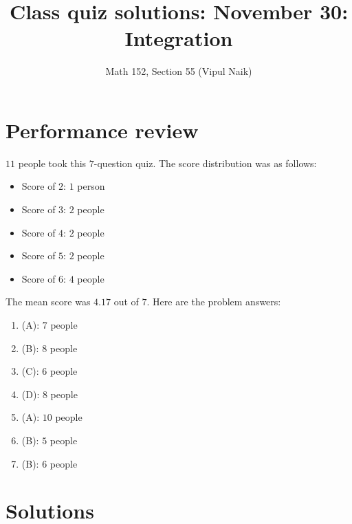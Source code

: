 \documentclass[10pt]{amsart}
\title{Class quiz solutions: November 30: Integration}
\author{Math 152, Section 55 (Vipul Naik)}
\begin{document}
\maketitle

\section{Performance review}

$11$ people took this $7$-question quiz. The score distribution was as follows:

\begin{itemize}
\item Score of $2$: $1$ person
\item Score of $3$: $2$ people
\item Score of $4$: $2$ people
\item Score of $5$: $2$ people
\item Score of $6$: $4$ people
\end{itemize}

The mean score was $4.17$ out of $7$. Here are the problem answers:

\begin{enumerate}
\item (A): $7$ people
\item (B): $8$ people
\item (C): $6$ people
\item (D): $8$ people
\item (A): $10$ people
\item (B): $5$ people
\item (B): $6$ people
\end{enumerate}

\section{Solutions}
\end{document}
